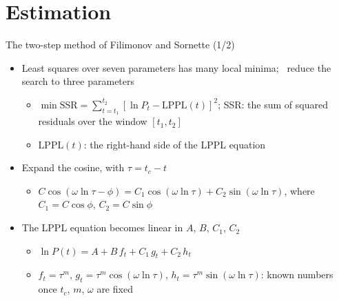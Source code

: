\section{Estimation}

\begin{frame}{The two-step method of Filimonov and Sornette (1/2)}
\itemsize{\footnotesize}
\begin{itemize}
    \item Least squares over seven parameters has many local minima; \ reduce the search to three parameters
    \begin{itemize}
        \item $\min \mathrm{SSR} = \sum_{t=t_1}^{t_2} [\ln P_t - \mathrm{LPPL}(t)]^2$; SSR: the sum of squared residuals over the window $[t_1, t_2]$
        \item $\mathrm{LPPL}(t)$: the right-hand side of the LPPL equation
    \end{itemize}
    \item Expand the cosine, with $\tau = t_c - t$
    \begin{itemize}
        \item $C\cos(\omega\ln\tau - \phi) = C_1\cos(\omega\ln\tau) + C_2\sin(\omega\ln\tau)$, where $C_1 = C\cos\phi$, $C_2 = C\sin\phi$
    \end{itemize}
    \item The LPPL equation becomes linear in $A$, $B$, $C_1$, $C_2$
    \begin{itemize}
        \item $\ln P(t) = A + B\,f_t + C_1\,g_t + C_2\,h_t$
        \item $f_t = \tau^m$, $g_t = \tau^m\cos(\omega\ln\tau)$, $h_t = \tau^m\sin(\omega\ln\tau)$: known numbers once $t_c$, $m$, $\omega$ are fixed
    \end{itemize}
\end{itemize}
\end{frame}

